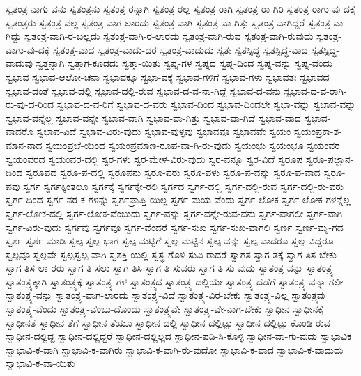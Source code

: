 {ಸ್ವತಂತ್ರ-ನಾಗು-ವನು
ಸ್ವತಂತ್ರನು
ಸ್ವತಂತ್ರ-ರನ್ನಾಗಿ
ಸ್ವತಂತ್ರ-ರಲ್ಲ
ಸ್ವತಂತ್ರ-ರಾಗಿ
ಸ್ವತಂತ್ರ-ರಾ-ಗಿರಿ
ಸ್ವತಂತ್ರ-ರಾಗು-ವು-ದಕ್ಕೆ
ಸ್ವತಂತ್ರರು
ಸ್ವತಂತ್ರ-ವಲ್ಲ
ಸ್ವತಂತ್ರ-ವಾಗ-ಲಾರದು
ಸ್ವತಂತ್ರ-ವಾಗಿ
ಸ್ವತಂತ್ರ-ವಾ-ಗಿತ್ತು
ಸ್ವತಂತ್ರ-ವಾಗಿದ್ದರೆ
ಸ್ವತಂತ್ರ-ವಾ-ಗಿದ್ದು
ಸ್ವತಂತ್ರ-ವಾಗಿ-ರ-ಬಲ್ಲದು
ಸ್ವತಂತ್ರ-ವಾಗಿ-ರ-ಲಾರದು
ಸ್ವತಂತ್ರ-ವಾಗಿ-ರುವ
ಸ್ವತಂತ್ರ-ವಾಗಿ-ರುವುದು
ಸ್ವತಂತ್ರ-ವಾಗು-ವು-ದಕ್ಕೆ
ಸ್ವತಂತ್ರ-ವಾದ
ಸ್ವತಂತ್ರ-ವಾದು-ದರ
ಸ್ವತಂತ್ರ-ವಾದುದು
ಸ್ವತಃ
ಸ್ವತಸ್ಸಿದ್ಧ
ಸ್ವತಸ್ಸಿದ್ಧ-ವಾದ
ಸ್ವತಸ್ಸಿದ್ಧ-ವಾದುವು
ಸ್ವತ್ತನ್ನಾಗಿ
ಸ್ವತ್ತಾಗ-ಕೂಡದು
ಸ್ವತ್ತಾ-ಯಿತು
ಸ್ವಪ್ನ-ಗಳ
ಸ್ವಪ್ನದ
ಸ್ವಪ್ನ-ದಿಂದ
ಸ್ವಪ್ನ-ವನ್ನು
ಸ್ವಪ್ನ-ವೆಂದು
ಸ್ವಭಾವ
ಸ್ವಭಾವ-ಆಲೋ-ಚನಾ
ಸ್ವಭಾವಕ್ಕೂ
ಸ್ವಭಾ-ವಕ್ಕೆ
ಸ್ವಭಾವ-ಗಳಿಗೆ
ಸ್ವಭಾವ-ಗಳು
ಸ್ವಭಾವತಃ
ಸ್ವಭಾವದ
ಸ್ವಭಾವ-ದಂತೆ
ಸ್ವಭಾವ-ದಲ್ಲಿ
ಸ್ವಭಾವ-ದಲ್ಲಿ-ರುವ
ಸ್ವಭಾವ-ದ-ವ-ನಾ-ಗಿದ್ದೆ
ಸ್ವಭಾವ-ದ-ವನು
ಸ್ವಭಾವ-ದ-ವ-ರಾಗಿ-ರು-ವು-ದ-ರಿಂದ
ಸ್ವಭಾವ-ದ-ವ-ರಿಗೆ
ಸ್ವಭಾವ-ದ-ವರು
ಸ್ವಭಾವ-ದಿಂದ
ಸ್ವಭಾವ-ದಿಂದಲೇ
ಸ್ವಭಾ-ವನ್ನು
ಸ್ವಭಾವ-ವನ್ನು
ಸ್ವಭಾವ-ವನ್ನೆಲ್ಲ
ಸ್ವಭಾವ-ವನ್ನೇ
ಸ್ವಭಾವ-ವಾಗಿ
ಸ್ವಭಾವ-ವಾ-ಗಿತ್ತು
ಸ್ವಭಾವ-ವಾ-ಗಿದೆ
ಸ್ವಭಾವ-ವಾದ
ಸ್ವಭಾವ-ವಾದರೊ
ಸ್ವಭಾವ-ವಿದೆ
ಸ್ವಭಾವ-ವಿರು-ವುದು
ಸ್ವಭಾವ-ವುಳ್ಳವು
ಸ್ವಭಾವವೂ
ಸ್ವಭಾವವೇ
ಸ್ವಯಂ
ಸ್ವಯಂಪ್ರಕಾ-ಶ-ಮಾನ-ನಾದ
ಸ್ವಯಂಪ್ರಭೆ-ಯಿಂದ
ಸ್ವಯಂಪ್ರಮಾಣ-ರೂಪ-ವಾ-ಗಿ-ರು-ವುದು
ಸ್ವಯಂಭು
ಸ್ವಯಂಭೂ
ಸ್ವಯಂವರ
ಸ್ವಯಂವರದ
ಸ್ವಯಂವರ-ದಲ್ಲಿ
ಸ್ವರ-ಗಳು
ಸ್ವರ-ಮೇಳ-ವಿರು-ವುದು
ಸ್ವರ-ವನ್ನೂ
ಸ್ವರ-ವಿದೆ
ಸ್ವರೂಪ
ಸ್ವರೂ-ಪಜ್ಞಾನ-ದಿಂದ
ಸ್ವರೂಪದ
ಸ್ವರೂ-ಪ-ದಲ್ಲಿ
ಸ್ವರೂಪನು
ಸ್ವರೂ-ಪರು
ಸ್ವರೂ-ಪಳು
ಸ್ವರೂ-ಪ-ವನ್ನು
ಸ್ವರೂ-ಪ-ವಾದ
ಸ್ವರೂ-ಪವು
ಸ್ವರ್ಗ
ಸ್ವರ್ಗಕ್ಕಿಂತಲೂ
ಸ್ವರ್ಗಕ್ಕೆ
ಸ್ವರ್ಗಕ್ಕೇ-ರಲಿ
ಸ್ವರ್ಗದ
ಸ್ವರ್ಗ-ದಲ್ಲಿ
ಸ್ವರ್ಗ-ದಲ್ಲಿ-ರುವ
ಸ್ವರ್ಗ-ದಲ್ಲಿ-ರು-ವರು
ಸ್ವರ್ಗ-ದಿಂದ
ಸ್ವರ್ಗ-ನರ-ಕ-ಗಳನ್ನು
ಸ್ವರ್ಗಪ್ರಾಪ್ತಿ-ಯಿಲ್ಲ
ಸ್ವರ್ಗ-ಮಯ-ವೆಂದು
ಸ್ವರ್ಗ-ಲೋಕ
ಸ್ವರ್ಗ-ಲೋಕ-ಗಳನ್ನೆಲ್ಲ
ಸ್ವರ್ಗ-ಲೋಕ-ದಲ್ಲಿ
ಸ್ವರ್ಗ-ಲೋಕ-ವೆಂಬುದು
ಸ್ವರ್ಗ-ವನ್ನು
ಸ್ವರ್ಗ-ವನ್ನೇ-ರುವ-ವನು
ಸ್ವರ್ಗ-ವಾಗಲೀ
ಸ್ವರ್ಗ-ವಾಗಿ
ಸ್ವರ್ಗ-ವಿರು-ವುದು
ಸ್ವರ್ಗವು
ಸ್ವರ್ಗವೂ
ಸ್ವರ್ಗ-ವೆಂದರೆ
ಸ್ವರ್ಗ-ಸುಖ
ಸ್ವರ್ಗ-ಸುಖ-ವಾಗಲಿ
ಸ್ವರ್ಣ
ಸ್ವರ್ಣ-ಮೃ-ಗದ
ಸ್ವರ್ಶ
ಸ್ವರ್ಶ-ಮಾಡಿ
ಸ್ವಲ್ಪ
ಸ್ವಲ್ಪ-ಭಾಗ
ಸ್ವಲ್ಪ-ಮಟ್ಟಿಗೆ
ಸ್ವಲ್ಪ-ಮಟ್ಟಿನ
ಸ್ವಲ್ಪ-ವನ್ನು
ಸ್ವಲ್ಪ-ವಾದರೂ
ಸ್ವಲ್ಪ-ವಿದ್ದರೂ
ಸ್ವಲ್ಪವೂ
ಸ್ವಲ್ಪವೇ
ಸ್ವಲ್ಪಸ್ವಲ್ಪ-ವಾಗಿ
ಸ್ವಶಕ್ತಿ-ಯಲ್ಲಿ
ಸ್ವಸ್ಥ-ಗೊಳಿ-ಸುವಿ-ರಾದರೆ
ಸ್ವಾಗತ
ಸ್ವಾಗ-ತಕ್ಕೆ
ಸ್ವಾಗ-ತಿಸ-ಬೇಕು
ಸ್ವಾಗ-ತಿಸ-ಲಾ-ರರು
ಸ್ವಾಗ-ತಿ-ಸಲು
ಸ್ವಾಗ-ತಿಸಿ
ಸ್ವಾಗ-ತಿ-ಸುವರು
ಸ್ವಾಗ-ತಿ-ಸು-ವುದು
ಸ್ವಾತಂತ್ರ-ವನ್ನು
ಸ್ವಾತಂತ್ರ್ಯ
ಸ್ವಾತಂತ್ರ್ಯಕ್ಕಾಗಿ
ಸ್ವಾತಂತ್ರ್ಯಕ್ಕೆ
ಸ್ವಾತಂತ್ರ್ಯ-ಗಳ
ಸ್ವಾತಂತ್ರ್ಯದ
ಸ್ವಾತಂತ್ರ್ಯ-ದಲ್ಲಿಯೇ
ಸ್ವಾತಂತ್ರ್ಯ-ದೆಡೆಗೆ
ಸ್ವಾತಂತ್ರ್ಯ-ವನ್ನಾ-ಗಲೀ
ಸ್ವಾತಂತ್ರ್ಯ-ವನ್ನು
ಸ್ವಾತಂತ್ರ್ಯ-ವಾಗ-ಲಾರದು
ಸ್ವಾತಂತ್ರ್ಯ-ವಿದೆ
ಸ್ವಾತಂತ್ರ್ಯ-ವಿರ-ಬೇಕು
ಸ್ವಾತಂತ್ರ್ಯ-ವಿಲ್ಲ
ಸ್ವಾತಂತ್ರ್ಯವು
ಸ್ವಾತಂತ್ರ್ಯ-ವೆಂದು
ಸ್ವಾತಂತ್ರ್ಯ-ವೆಂಬು-ದೊಂದು
ಸ್ವಾತಂತ್ರ್ಯವೇ
ಸ್ವಾತಂತ್ರ್ಯ-ವೇ-ನಾಗ-ಬೇಕು
ಸ್ವಾಧೀನ
ಸ್ವಾಧೀನಕ್ಕೆ
ಸ್ವಾಧೀನತೆ
ಸ್ವಾಧೀನ-ತೆಗೆ
ಸ್ವಾಧೀನ-ತೆಯೂ
ಸ್ವಾಧೀನ-ದಲ್ಲಿ
ಸ್ವಾಧೀನ-ದಲ್ಲಿಟ್ಟು
ಸ್ವಾಧೀನ-ದಲ್ಲಿಟ್ಟು-ಕೊಂಡಿ-ರುವ
ಸ್ವಾಧೀನ-ದಲ್ಲಿದ್ದ
ಸ್ವಾಧೀನ-ದಲ್ಲಿದ್ದರೆ
ಸ್ವಾಧೀನ-ದಲ್ಲಿಲ್ಲದ
ಸ್ವಾಧೀನ-ಪಡಿ-ಸಿ-ಕೊಳ್ಳಿ
ಸ್ವಾಧೀನ-ವಾ-ಗು-ವುದು
ಸ್ವಾಭಾವಿಕ
ಸ್ವಾಭಾವಿ-ಕ-ವಾಗಿ
ಸ್ವಾಭಾವಿ-ಕ-ವಾಗಿರು
ಸ್ವಾಭಾವಿ-ಕ-ವಾಗಿ-ರು-ವುದೋ
ಸ್ವಾಭಾವಿ-ಕ-ವಾದ
ಸ್ವಾಭಾವಿ-ಕ-ವಾದುದು
ಸ್ವಾಭಾವಿ-ಕ-ವಾ-ಯಿತು
}
